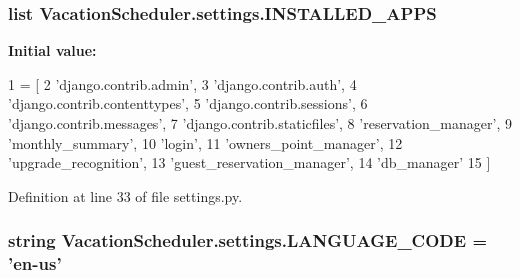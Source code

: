 \hypertarget{namespaceVacationScheduler_1_1settings_a0813658850d65a1cd79b3c90020160be}{
\subsubsection[{I\-N\-S\-T\-A\-L\-L\-E\-D\-\_\-\-A\-P\-P\-S}]{\setlength{\rightskip}{0pt plus 5cm}list Vacation\-Scheduler.\-settings.\-I\-N\-S\-T\-A\-L\-L\-E\-D\-\_\-\-A\-P\-P\-S}}\label{namespaceVacationScheduler_1_1settings_a0813658850d65a1cd79b3c90020160be}
{\bfseries Initial value\-:}
\begin{DoxyCode}
1 = [
2     \textcolor{stringliteral}{'django.contrib.admin'},
3     \textcolor{stringliteral}{'django.contrib.auth'},
4     \textcolor{stringliteral}{'django.contrib.contenttypes'},
5     \textcolor{stringliteral}{'django.contrib.sessions'},
6     \textcolor{stringliteral}{'django.contrib.messages'},
7     \textcolor{stringliteral}{'django.contrib.staticfiles'},
8     \textcolor{stringliteral}{'reservation\_manager'},
9     \textcolor{stringliteral}{'monthly\_summary'},
10     \textcolor{stringliteral}{'login'},
11     \textcolor{stringliteral}{'owners\_point\_manager'},
12     \textcolor{stringliteral}{'upgrade\_recognition'},
13     \textcolor{stringliteral}{'guest\_reservation\_manager'},
14     \textcolor{stringliteral}{'db\_manager'}
15 ]
\end{DoxyCode}


Definition at line 33 of file settings.\-py.

\hypertarget{namespaceVacationScheduler_1_1settings_a0d23e095276d91336cde84320fed122a}{
\subsubsection[{L\-A\-N\-G\-U\-A\-G\-E\-\_\-\-C\-O\-D\-E}]{\setlength{\rightskip}{0pt plus 5cm}string Vacation\-Scheduler.\-settings.\-L\-A\-N\-G\-U\-A\-G\-E\-\_\-\-C\-O\-D\-E = 'en-\/us'}}\label{namespaceVacationScheduler_1_1settings_a0d23e095276d91336cde84320fed122a}


